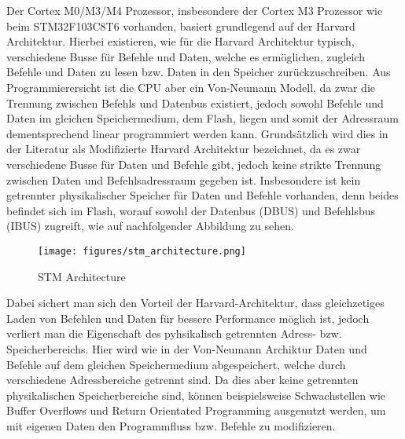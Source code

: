\documentclass[a4paper,
DIV=13,
12pt,
BCOR=10mm,
department=FakIM,
oneside,
parskip=half,
automark,
listof=totocnumbered,
bibliography=totocnumbered,
acronym=totocnumbered
] {OTHRartcl}
\begin{document}
Der Cortex M0/M3/M4 Prozessor, insbesondere der Cortex M3 Prozessor wie beim STM32F103C8T6 vorhanden, basiert grundlegend auf der Harvard Architektur.
Hierbei existieren, wie für die Harvard Architektur typisch, verschiedene Busse für Befehle und Daten, welche es ermöglichen, zugleich Befehle und Daten zu lesen bzw. Daten in den Speicher zurückzuschreiben.
Aus Programmierersicht ist die CPU aber ein Von-Neumann Modell, da zwar die Trennung zwischen Befehls und Datenbus existiert, jedoch sowohl Befehle und Daten im gleichen Speichermedium, dem Flash, liegen und
somit der Adressraum dementsprechend linear programmiert werden kann.
Grundsätzlich wird dies in der Literatur als Modifizierte Harvard Architektur bezeichnet, da es zwar verschiedene Busse für Daten und Befehle gibt, jedoch keine strikte Trennung zwischen Daten und Befehlsadressraum gegeben ist.
Insbesondere ist kein getrennter physikalischer Speicher für Daten und Befehle vorhanden, denn beides befindet sich im Flash, worauf sowohl der Datenbus (DBUS) und Befehlsbus (IBUS) zugreift, wie auf
nachfolgender Abbildung zu sehen.
\begin{figure}[ht!]
  \begin{center}
    \texttt{[image: figures/stm\_architecture.png]}
    \caption{STM Architecture}
    \label{fig: STM Architektur}
  \end{center}
\end{figure}
Dabei sichert man sich den Vorteil der Harvard-Architektur, dass gleichzetiges Laden von Befehlen und Daten für bessere Performance möglich ist, jedoch
verliert man die Eigenschaft des pyhsikalisch getrennten Adress- bzw. Speicherbereichs. Hier wird wie in der Von-Neumann Archiktur Daten und Befehle auf dem gleichen Speichermedium abgespeichert, welche durch verschiedene Adressbereiche getrennt sind. Da dies aber keine getrennten physikalischen Speicherbereiche sind, können beispielsweise Schwachstellen wie Buffer Overflows und Return Orientated Programming ausgenutzt werden, um mit eigenen Daten den Programmfluss bzw. Befehle zu modifizieren.
\cite{ARM Modell Overview} \cite{STM32 Mikro Prozessorarchitekturen} \cite{STM32 Mikro STM32} \cite{STM32 Controller Lecture}
\end{document}
